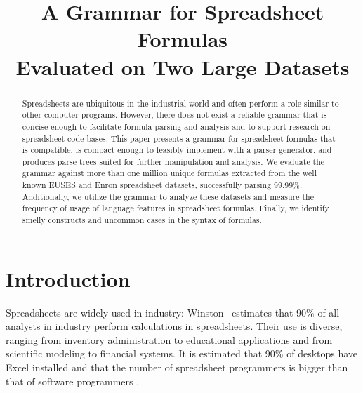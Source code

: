 \documentclass[conference]{IEEEtran}
\begin{document}
\title{A Grammar for Spreadsheet Formulas\\Evaluated on Two Large Datasets}

\author{
}
\maketitle

\begin{abstract}
Spreadsheets are ubiquitous in the industrial world and often perform a role similar to other computer programs.
However, there does not exist a reliable grammar that is concise enough to facilitate formula parsing and analysis and to support research on spreadsheet code bases.
This paper presents a grammar for spreadsheet formulas that is compatible, is compact enough to feasibly implement with a parser generator, and produces parse trees suited for further manipulation and analysis. 
We evaluate the grammar against more than one million unique formulas extracted from the well known EUSES and Enron spreadsheet datasets, successfully parsing 99.99\%.
Additionally, we utilize the grammar to analyze these datasets and measure the frequency of usage of language features in spreadsheet formulas.
Finally, we identify smelly constructs and uncommon cases in the syntax of formulas.
\end{abstract}

\IEEEpeerreviewmaketitle

\section{Introduction}
Spreadsheets are widely used in industry: Winston~\cite{Wins2001} estimates that 90\% of all analysts in industry perform calculations in
spreadsheets. Their use is diverse, ranging from inventory administration to educational applications and from scientific
modeling to financial systems. It is estimated that 90\% of desktops have Excel installed \cite{DBLP:conf/icse/BradleyM09} and that the number of spreadsheet programmers is bigger than that of software programmers \cite{DBLP:conf/vl/ScaffidiSM05}. 
\end{document}
